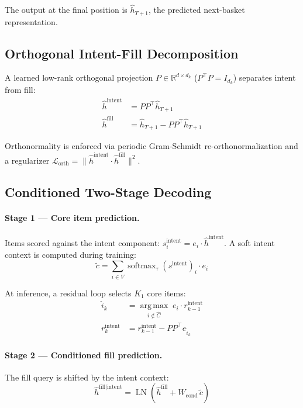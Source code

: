 \documentclass[conference]{IEEEtran}
\begin{document}
The output at the final position is $\hat{h}_{T+1}$, the predicted next-basket representation.

\subsection{Orthogonal Intent-Fill Decomposition}
A learned low-rank orthogonal projection $P \in \mathbb{R}^{d \times d_k}$ ($P^\top P = I_{d_k}$) separates intent from fill:
\begin{align}
\hat{h}^{\text{intent}} &= PP^\top \hat{h}_{T+1} \\
\hat{h}^{\text{fill}}   &= \hat{h}_{T+1} - PP^\top \hat{h}_{T+1}
\end{align}

Orthonormality is enforced via periodic Gram-Schmidt re-orthonormalization and a regularizer $\mathcal{L}_{\text{orth}} = \|\hat{h}^{\text{intent}} \cdot \hat{h}^{\text{fill}}\|^2$.

\subsection{Conditioned Two-Stage Decoding}

\paragraph{Stage 1 --- Core item prediction.}
Items scored against the intent component: $s_i^{\text{intent}} = e_i \cdot \hat{h}^{\text{intent}}$.
A soft intent context is computed during training:
\begin{equation}
\tilde{c} = \sum_{i \in V} \operatorname{softmax}_\tau(s^{\text{intent}})_i \cdot e_i
\end{equation}

At inference, a residual loop selects $K_1$ core items:
\begin{align}
\hat{i}_k &= \operatorname*{arg\,max}_{i \notin \hat{C}}\; e_i \cdot r_{k-1}^{\text{intent}} \\
r_k^{\text{intent}} &= r_{k-1}^{\text{intent}} - PP^\top e_{\hat{i}_k}
\end{align}

\paragraph{Stage 2 --- Conditioned fill prediction.}
The fill query is shifted by the intent context:
\begin{equation}
\hat{h}^{\text{fill} \mid \text{intent}} = \operatorname{LN}\!\left(\hat{h}^{\text{fill}} + W_{\text{cond}}\, \tilde{c}\right)
\end{equation}
\end{document}
